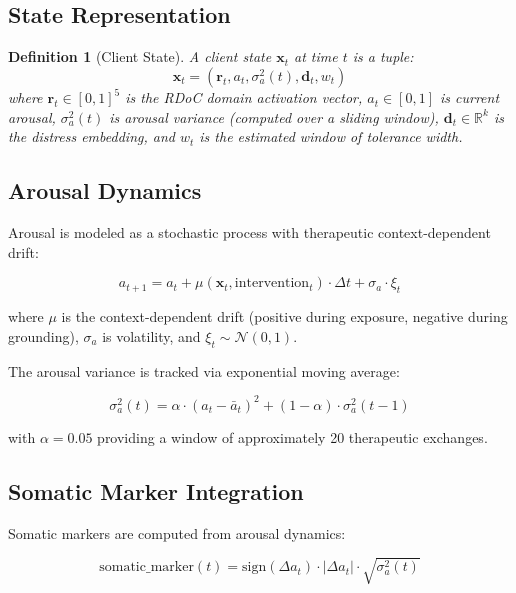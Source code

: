 \documentclass[11pt,a4paper]{article}
\newtheorem{definition}{Definition}
\begin{document}
\subsection{State Representation}

\begin{definition}[Client State]
A client state $\mathbf{x}_t$ at time $t$ is a tuple:
\begin{equation}
\mathbf{x}_t = (\mathbf{r}_t, a_t, \sigma^2_a(t), \mathbf{d}_t, w_t)
\end{equation}
where $\mathbf{r}_t \in [0,1]^5$ is the RDoC domain activation vector, $a_t \in [0,1]$ is current arousal, $\sigma^2_a(t)$ is arousal variance (computed over a sliding window), $\mathbf{d}_t \in \mathbb{R}^k$ is the distress embedding, and $w_t$ is the estimated window of tolerance width.
\end{definition}

\subsection{Arousal Dynamics}

Arousal is modeled as a stochastic process with therapeutic context-dependent drift:

\begin{equation}
a_{t+1} = a_t + \mu(\mathbf{x}_t, \text{intervention}_t) \cdot \Delta t + \sigma_a \cdot \xi_t
\end{equation}

where $\mu$ is the context-dependent drift (positive during exposure, negative during grounding), $\sigma_a$ is volatility, and $\xi_t \sim \mathcal{N}(0, 1)$.

The arousal variance is tracked via exponential moving average:

\begin{equation}
\sigma^2_a(t) = \alpha \cdot (a_t - \bar{a}_t)^2 + (1 - \alpha) \cdot \sigma^2_a(t-1)
\end{equation}

with $\alpha = 0.05$ providing a window of approximately 20 therapeutic exchanges.

\subsection{Somatic Marker Integration}

Somatic markers are computed from arousal dynamics:

\begin{equation}
\text{somatic\_marker}(t) = \text{sign}(\Delta a_t) \cdot |\Delta a_t| \cdot \sqrt{\sigma^2_a(t)}
\end{equation}
\end{document}
